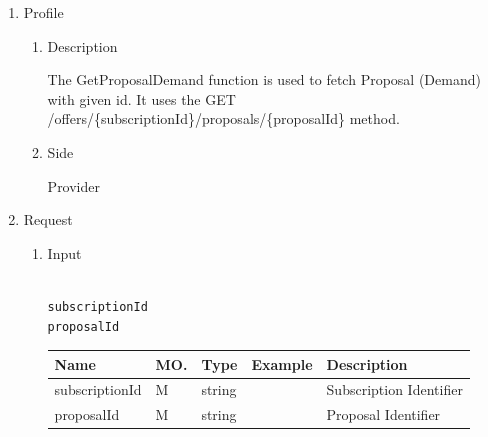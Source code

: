 \begin{enumerate}

\item Profile

\begin{enumerate}

\item Description

The GetProposalDemand function is used to fetch Proposal (Demand) with given id. 
It uses the GET /offers/\{subscriptionId\}/proposals/\{proposalId\} method.

\item Side

Provider

\end{enumerate}

\item Request

\begin{enumerate}

\item Input

\begin{tcolorbox}[boxrule=0pt, frame empty]
\begin{verbatim}

subscriptionId
proposalId

\end{verbatim}
\end{tcolorbox}


\begin{center}
\begin{tabular}{|p{3cm}|l|p{3cm}|p{3cm}|p{4cm}|} 
\hline
\rowcolor{lightgray}	Name	& MO.	& Type	& Example & 	Description \\
\hline

subscriptionId	& M	& 	string			&		&	Subscription Identifier \\ 

\hline

proposalId		& M & 	string			&		&	Proposal Identifier \\

\hline	

\end{tabular}
\end{center}


\end{enumerate}
\end{enumerate}
